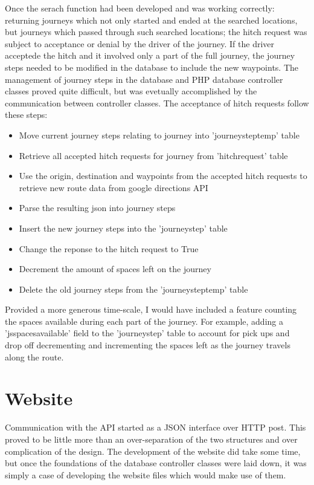 Once the serach function had been developed and was working correctly: returning journeys which not only started and ended at the searched locations, but journeys which passed through such searched locations; the hitch request was subject to acceptance or denial by the driver of the journey. If the driver acceptede the hitch and it involved only a part of the full journey, the journey steps needed to be modified in the database to include the new waypoints. The management of journey steps in the database and PHP database controller classes proved quite difficult, but was evetually accomplished by the communication between controller classes. The acceptance of hitch requests follow these steps:

\begin{itemize}
\item Move current journey steps relating to journey into 'journey\textunderscore step\textunderscore temp' table
\item Retrieve all accepted hitch requests for journey from 'hitch\textunderscore request' table
\item Use the origin, destination and waypoints from the accepted hitch requests to retrieve new route data from google directions API
\item Parse the resulting json into journey steps
\item Insert the new journey steps into the 'journey\textunderscore step' table
\item Change the reponse to the hitch request to True
\item Decrement the amount of spaces left on the journey
\item Delete the old journey steps from the 'journey\textunderscore step\textunderscore temp' table
\end{itemize}

Provided a more generous time-scale, I would have included a feature counting the spaces available during each part of the journey. For example, adding a 'js\textunderscore spaces\textunderscore available' field to the 'journey\textunderscore step' table to account for pick ups and drop off decrementing and incrementing the spaces left as the journey travels along the route.
	
\section{Website}
	Communication with the API started as a JSON interface over HTTP post. This proved to be little more than an over-separation of the two structures and over complication of the design. The development of the website did take some time, but once the foundations of the database controller classes were laid down, it was simply a case of developing the website files which would make use of them.
	
